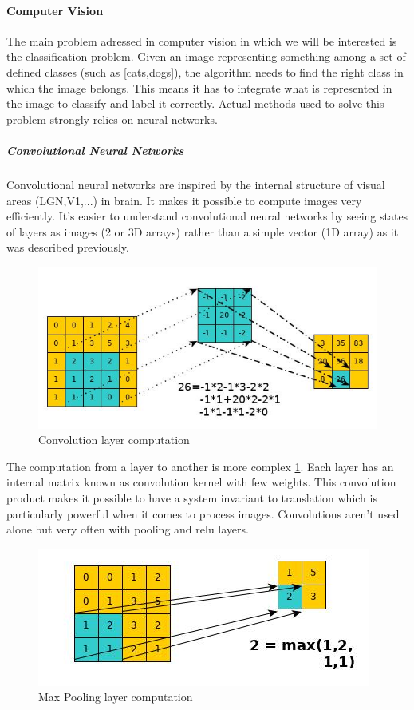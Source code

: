 \documentclass[11pt]{article}
\begin{document}
\paragraph{Computer Vision}
The main problem adressed in computer vision in which we will be interested is the classification problem. Given an image representing something among a set of defined classes (such as [cats,dogs]), the algorithm needs to find the right class in which the image belongs. This means it has to integrate what is represented in the image to classify and label it correctly. Actual methods used to solve this problem strongly relies on neural networks.
\subparagraph{Convolutional Neural Networks}
Convolutional neural networks are inspired by the internal structure of visual areas (LGN,V1,...) in brain. It makes it possible to compute images very efficiently. It's easier to understand convolutional neural networks by seeing states of layers as images (2 or 3D arrays) rather than a simple vector (1D array) as it was described previously.\\
\begin{figure}[!h]
\centering
\includegraphics[scale=0.40]{conv.jpg}
\caption{Convolution layer computation}
\label{conv}
\end{figure}

The computation from a layer to another is more complex \ref{conv}.
Each layer has an internal matrix known as convolution kernel with few weights. This convolution product makes it possible to have a system invariant to translation which is particularly powerful when it comes to process images.
Convolutions aren't used alone but very often with pooling and relu layers.

\begin{figure}[!h]
\centering
\includegraphics[scale=0.40]{pool.jpg}
\caption{Max Pooling layer computation}
\label{pool}
\end{figure}
\end{document}

